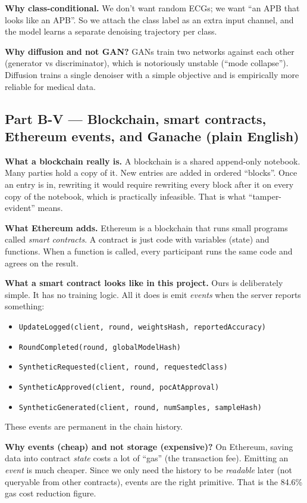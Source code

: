 \documentclass[11pt,a4paper]{article}
\begin{document}
\textbf{Why class-conditional.}
We don't want random ECGs; we want ``an APB that looks like an APB''. So we
attach the class label as an extra input channel, and the model learns a
separate denoising trajectory per class.

\textbf{Why diffusion and not GAN?}
GANs train two networks against each other (generator vs discriminator), which
is notoriously unstable (``mode collapse''). Diffusion trains a single denoiser
with a simple objective and is empirically more reliable for medical data.

\subsection{Part B-V --- Blockchain, smart contracts, Ethereum events, and Ganache (plain English)}
\label{sec:blockchain-conceptual}

\textbf{What a blockchain really is.}
A blockchain is a shared append-only notebook. Many parties hold a copy of it.
New entries are added in ordered ``blocks''. Once an entry is in, rewriting it
would require rewriting every block after it on every copy of the notebook,
which is practically infeasible. That is what ``tamper-evident'' means.

\textbf{What Ethereum adds.}
Ethereum is a blockchain that runs small programs called \emph{smart contracts}.
A contract is just code with variables (state) and functions. When a function
is called, every participant runs the same code and agrees on the result.

\textbf{What a smart contract looks like in this project.}
Ours is deliberately simple. It has no training logic. All it does is emit
\emph{events} when the server reports something:
\begin{itemize}
\item \texttt{UpdateLogged(client, round, weightsHash, reportedAccuracy)}
\item \texttt{RoundCompleted(round, globalModelHash)}
\item \texttt{SyntheticRequested(client, round, requestedClass)}
\item \texttt{SyntheticApproved(client, round, pocAtApproval)}
\item \texttt{SyntheticGenerated(client, round, numSamples, sampleHash)}
\end{itemize}
These events are permanent in the chain history.

\textbf{Why events (cheap) and not storage (expensive)?}
On Ethereum, saving data into contract \emph{state} costs a lot of ``gas''
(the transaction fee). Emitting an \emph{event} is much cheaper. Since we only
need the history to be \emph{readable} later (not queryable from other contracts),
events are the right primitive. That is the 84.6\% gas cost reduction figure.
\end{document}
